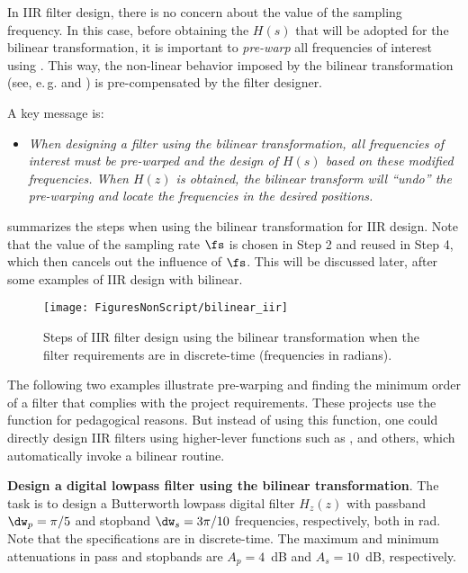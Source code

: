 In IIR filter design, there is no concern about the value of the sampling frequency.
In this case, before obtaining the $H(s)$ that will be adopted for the
bilinear transformation, it is important to \emph{pre-warp} all frequencies of interest
using . This way, the non-linear behavior imposed by
the bilinear transformation (see, 
e.\,g.  and ) is pre-compensated by the filter designer. 

A key message is: 
\begin{itemize}
\item \emph{When designing a filter using the bilinear transformation, all frequencies of interest must be pre-warped and the design of $H(s)$ based on these modified frequencies. When $H(z)$ is obtained, the bilinear
transform will ``undo'' the pre-warping and locate the frequencies in the desired positions.}
\end{itemize}

 summarizes the steps when using the bilinear transformation for IIR design.
Note that the value of the sampling rate $\fs$ is chosen in Step 2 and reused in Step 4, which then
cancels out the influence of $\fs$. This will be discussed later, after some examples of IIR design
with bilinear.

\begin{figure}
\centering
\texttt{[image: FiguresNonScript/bilinear\_iir]}
\caption{Steps of IIR filter design using the bilinear transformation when the filter requirements are in discrete-time (frequencies in radians).\label{fig:bilinear_iir}}
\end{figure}


The following two examples illustrate pre-warping and finding the minimum order of a filter that
complies with the project requirements.
These projects use the  function for pedagogical reasons. But instead of using this function, one could directly design IIR filters using higher-lever functions such as ,  and others, which 
automatically invoke a bilinear routine.

\bExample \textbf{Design a digital lowpass filter using the bilinear transformation}.
\label{ex:bilinear_simple}
The task is to design a Butterworth lowpass digital filter $H_z(z)$ with 
passband $\dw_p=\pi/5$ and stopband $\dw_s=3\pi/10$ frequencies, respectively, both
in rad. Note that the specifications are in discrete-time. 
The maximum and minimum attenuations in pass and stopbands are $A_p=4$~dB and 
$A_s=10$~dB, respectively.

